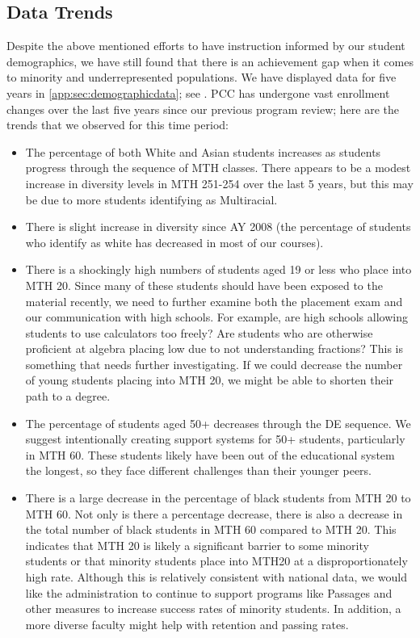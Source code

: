  \subsection{Data Trends}
 Despite the above mentioned efforts to have instruction informed by our student demographics, we have still found that there is an achievement gap when it comes to minority and underrepresented populations. We have displayed data for five years in \vref{app:sec:demographicdata}; see . PCC has undergone vast enrollment changes over the last five years since our previous program review; here are the trends that we observed for this time period:
 \begin{itemize}
   \item The percentage of both White and Asian students increases as students progress through the sequence of MTH classes. There appears to be a modest increase in diversity levels in MTH 251-254 over the last 5 years, but this may be due to more students identifying as Multiracial.
   \item There is slight increase in diversity since AY 2008 (the percentage of students who identify as white has decreased in most of our courses).  
   \item There is a shockingly high numbers of students aged 19 or less who place into MTH 20. Since many of these students should have been exposed to the material recently, we need to further examine both the placement exam and our communication with high schools. For example, are high schools allowing students to use calculators too freely? Are students who are otherwise proficient at algebra placing low due to not understanding fractions? This is something that needs further investigating. If we could decrease the number of young students placing into MTH 20, we might be able to shorten their path to a degree.
   \item The percentage of students aged 50+ decreases through the DE sequence. We suggest intentionally creating support systems for 50+ students, particularly in MTH 60. These students likely have been out of the educational system the longest, so they face different challenges than their younger peers.
   \item There is a large decrease in the percentage of black students from MTH 20 to MTH 60. Not only is there a percentage decrease, there is also a decrease in the total number of black students in MTH 60 compared to MTH 20. This indicates that MTH 20 is likely a significant barrier to some minority students or that minority students place into MTH20 at a disproportionately high rate. Although this is relatively consistent with national data, we would like the administration to continue to support programs like Passages and other measures to increase success rates of minority students. In addition, a more diverse faculty might help with retention and passing rates.

\end{itemize}
